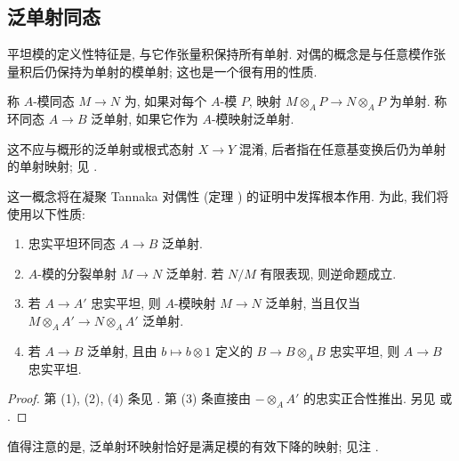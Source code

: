 \subsection{泛单射同态}\label{src:A.2.5-subsection}
平坦模的定义性特征是, 与它作张量积保持所有单射. 对偶的概念是与任意模作张量积后仍保持为单射的模单射; 这也是一个很有用的性质.
\begin{definition}\label{src:A.2.22}
称 $A$-模同态 $M\to N$ 为, 如果对每个 $A$-模 $P$, 映射 $M\otimes_A P\to N\otimes_A P$ 为单射. 称环同态 $A\to B$ 泛单射, 如果它作为 $A$-模映射泛单射.
\end{definition}
\begin{remark}\label{src:A.2.23}
这不应与概形的泛单射或根式态射 $X\to Y$ 混淆, 后者指在任意基变换后仍为单射的单射映射; 见 \cite[Tag 01S2]{SP}.
\end{remark}
这一概念将在凝聚 Tannaka 对偶性 (定理 ) 的证明中发挥根本作用. 为此, 我们将使用以下性质:
\begin{proposition}\label{src:A.2.24}
\begin{enumerate}[(1)]
\item 忠实平坦环同态 $A\to B$ 泛单射.
\item $A$-模的分裂单射 $M\to N$ 泛单射. 若 $N/M$ 有限表现, 则逆命题成立.
\item 若 $A\to A'$ 忠实平坦, 则 $A$-模映射 $M\to N$ 泛单射, 当且仅当 $M\otimes_A A'\to N\otimes_A A'$ 泛单射.
\item 若 $A\to B$ 泛单射, 且由 $b\mapsto b\otimes1$ 定义的 $B\to B\otimes_A B$ 忠实平坦, 则 $A\to B$ 忠实平坦.
\end{enumerate}
\end{proposition}
\begin{proof}
第 (1), (2), (4) 条见 \cite[Tags 08WP, 058L, 08XD]{SP}. 第 (3) 条直接由 $-\otimes_A A'$ 的忠实正合性推出. 另见 \cite{Laz69} 或 \cite[\S$4$J]{Lam99}.
\end{proof}
值得注意的是, 泛单射环映射恰好是满足模的有效下降的映射; 见注 .
